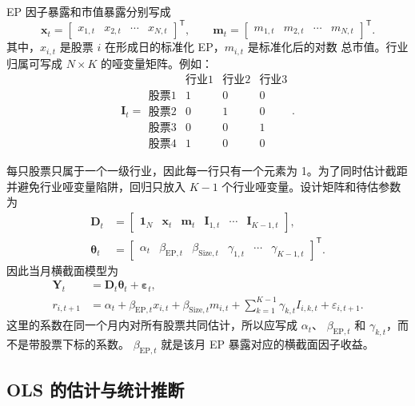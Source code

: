 \documentclass[UTF8,a4paper,11pt]{ctexart}
\begin{document}
EP 因子暴露和市值暴露分别写成
\begin{equation}
  \bm{x}_t=
  \begin{bmatrix}x_{1,t}&x_{2,t}&\cdots&x_{N,t}\end{bmatrix}^{\mathsf T},
  \qquad
  \bm{m}_t=
  \begin{bmatrix}m_{1,t}&m_{2,t}&\cdots&m_{N,t}\end{bmatrix}^{\mathsf T}.
\end{equation}
其中，$x_{i,t}$ 是股票 $i$ 在形成日的标准化 EP，$m_{i,t}$ 是标准化后的对数
总市值。行业归属可写成 $N\times K$ 的哑变量矩阵。例如：
\begin{equation*}
\bm{I}_t=
\begin{array}{c|ccc}
  & \text{行业1} & \text{行业2} & \text{行业3} \\ \hline
  \text{股票1} & 1&0&0\\
  \text{股票2} & 0&1&0\\
  \text{股票3} & 0&0&1\\
  \text{股票4} & 1&0&0
\end{array}.
\end{equation*}

每只股票只属于一个一级行业，因此每一行只有一个元素为 1。为了同时估计截距
并避免行业哑变量陷阱，回归只放入 $K-1$ 个行业哑变量。设计矩阵和待估参数为
\begin{align}
  \bm{D}_t
  &=\begin{bmatrix}
      \bm{1}_N&\bm{x}_t&\bm{m}_t&\bm{I}_{1,t}&\cdots&\bm{I}_{K-1,t}
    \end{bmatrix},\\
  \bm{\theta}_t
  &=\begin{bmatrix}
      \alpha_t&\beta_{\mathrm{EP},t}&\beta_{\mathrm{Size},t}&
      \gamma_{1,t}&\cdots&\gamma_{K-1,t}
    \end{bmatrix}^{\mathsf T}.
\end{align}
因此当月横截面模型为
\begin{align}
  \bm{Y}_t&=\bm{D}_t\bm{\theta}_t+\bm{\varepsilon}_t,\\
  r_{i,t+1}
  &=\alpha_t+\beta_{\mathrm{EP},t}x_{i,t}
    +\beta_{\mathrm{Size},t}m_{i,t}
    +\sum_{k=1}^{K-1}\gamma_{k,t}I_{i,k,t}
    +\varepsilon_{i,t+1}.
\end{align}
这里的系数在同一个月内对所有股票共同估计，所以应写成 $\alpha_t$、
$\beta_{\mathrm{EP},t}$ 和 $\gamma_{k,t}$，而不是带股票下标的系数。
$\beta_{\mathrm{EP},t}$ 就是该月 EP 暴露对应的横截面因子收益。

\subsection{OLS 的估计与统计推断}
\end{document}
